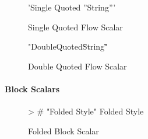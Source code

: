\begin{figure}[H]
  \begin{minipage}[t]{0.48\textwidth}
    \vspace{0pt}
    \begin{bchart}[max=9, width=0.85\textwidth]
    \end{bchart}
  \end{minipage}
  \begin{minipage}[t]{0.48\textwidth}
    \vspace{0pt}
    \begin{yamlcode}
      'Single Quoted ''String'''
    \end{yamlcode}
  \end{minipage}
  \caption{Single Quoted Flow Scalar}
\end{figure}

\begin{figure}[H]
  \begin{minipage}[t]{0.48\textwidth}
    \vspace{0pt}
    \begin{bchart}[max=9, width=0.85\textwidth]
    \end{bchart}
  \end{minipage}
  \begin{minipage}[t]{0.48\textwidth}
    \vspace{0pt}
    \begin{yamlcode}
      "Double\n Quoted\n \"String\""
    \end{yamlcode}
  \end{minipage}
  \caption{Double Quoted Flow Scalar}
\end{figure}

\paragraph{Block Scalars}

\begin{figure}[H]
  \begin{minipage}[t]{0.48\textwidth}
    \vspace{0pt}
    \begin{bchart}[max=9, width=0.85\textwidth]
    \end{bchart}
  \end{minipage}
  \begin{minipage}[t]{0.48\textwidth}
    \vspace{0pt}
    \begin{yamlcode}
      > # "Folded Style"
        Folded
        Style
    \end{yamlcode}
  \end{minipage}
  \caption{Folded Block Scalar}
\end{figure}


